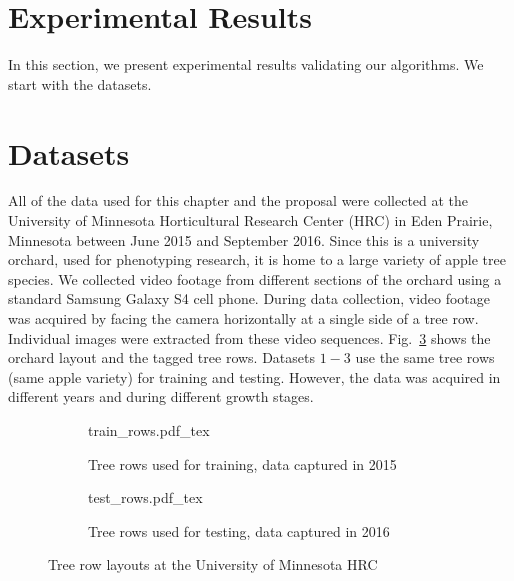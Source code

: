 \section{Experimental Results}\label{sec:expresult}
In this section, we present experimental results validating our algorithms. We start with the datasets.
\section{Datasets}
All of the data used for this chapter and the proposal were collected at the University of Minnesota Horticultural Research Center (HRC) in Eden Prairie, Minnesota between June 2015 and September 2016. Since this is a university orchard, used for phenotyping research, it is home to a large variety of apple tree species. We collected video footage from different sections of the orchard using a standard Samsung Galaxy S4 cell phone. During data collection, video footage was acquired by facing the camera horizontally at a single side of a tree row. Individual images were extracted from these video sequences. Fig.~\ref{fig:overview} shows the orchard layout and the tagged tree rows. Datasets $1-3$ use the same tree rows (same apple variety) for training and testing. However, the data was acquired in different years and during different growth stages.

\begin{figure}[!htb]
    \centering
    \begin{subfigure}[b]{.48\textwidth}
        \def\svgwidth{\textwidth}
        {train_rows.pdf_tex}
        \caption{Tree rows used for training, data captured in 2015}
        \label{fig:train}
    \end{subfigure}\quad\begin{subfigure}[b]{.48\textwidth}
        \def\svgwidth{\textwidth}
        {test_rows.pdf_tex}
        \caption{Tree rows used for testing, data captured in 2016}
        \label{fig:test}
    \end{subfigure}
    \caption[Tree row layouts at the University of Minnesota HRC.]{Tree row layouts at the University of Minnesota HRC}
    \label{fig:overview}
\end{figure}



